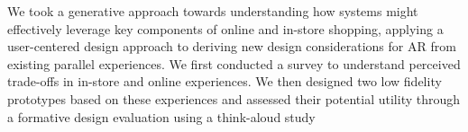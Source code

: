 

We took a generative approach towards understanding how systems might effectively leverage key components of online and in-store shopping,
applying
a user-centered design approach to deriving new design considerations for AR from existing parallel experiences. We first conducted a survey to understand perceived trade-offs in in-store and online experiences. 
We then designed two low fidelity prototypes based on these experiences and assessed their potential utility through a formative design evaluation using a think-aloud study %
